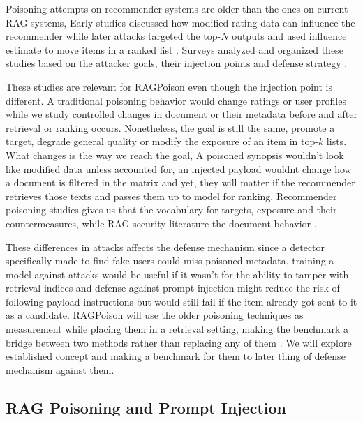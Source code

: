 Poisoning attempts on recommender systems are older than the ones on current RAG systems, Early studies discussed how modified rating data can influence the recommender \cite{li2016factorizationpoison} while later attacks targeted the top-$N$ outputs and used influence estimate to move items in a ranked list \cite{fang2020influencepoison}. Surveys analyzed and organized these studies based on the attacker goals, their injection points and defense strategy \cite{nguyen2024manipulatingrecsys,wang2024recpoisonsurvey}.

These studies are relevant for RAGPoison even though the injection point is different. A traditional poisoning behavior would change ratings or user profiles while we study controlled changes in document or their metadata before and after retrieval or ranking occurs. Nonetheless, the goal is still the same, promote a target, degrade general quality or modify the exposure of an item in top-$k$ lists. What changes is the way we reach the goal, A poisoned synopsis wouldn't look like modified data unless accounted for, an injected payload wouldnt change how a document is filtered in the matrix and yet, they will matter if the recommender retrieves those texts and passes them up to model for ranking. Recommender poisoning studies gives us that the vocabulary for targets, exposure and their countermeasures, while RAG security literature the document behavior \cite{jia2023pore,nguyen2024manipulatingrecsys,zhong2023retrievalcorpora,zou2025poisonedrag_usenix}.

These differences in attacks affects the defense mechanism since a detector specifically made to find fake users could miss poisoned metadata, training a model against attacks would be useful if it wasn't for the ability to tamper with retrieval indices and defense against prompt injection might reduce the risk of following payload instructions but would still fail if the item already got sent to it as a candidate. RAGPoison will use the older poisoning techniques as measurement while placing them in a retrieval setting, making the benchmark a bridge between two methods rather than replacing any of them \cite{ragpoisonlab_repo}. We will explore established concept and making a benchmark for them to later thing of defense mechanism against them.

\subsection{RAG Poisoning and Prompt Injection}

